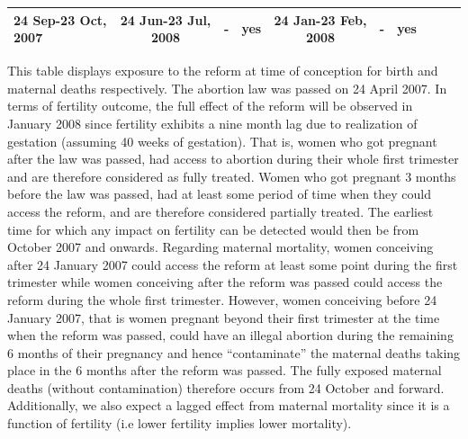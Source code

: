 \documentclass[a4paper, 11pt]{article}
\begin{document}
\begin{spacing}{1.4}
\begin{table}
\begin{threeparttable}
{\begin{tabular}{lccccccccc}
        24 Sep-23 Oct, 2007	&	24 Jun-23 Jul, 2008	&	-	&	yes	&	24 Jan-23 Feb, 2008	&	-	&	yes	\\
        \hline 	\hline 
    \end{tabular} }
    \begin{tablenotes}
      \small This table displays exposure to the reform at time of conception for birth and maternal deaths respectively. The abortion law was passed on 24 April 2007. In terms of fertility outcome, the full effect of the reform will be observed in January 2008 since fertility exhibits a nine month lag due to realization of gestation (assuming 40 weeks of gestation). That is, women who got pregnant after the law was passed, had access to abortion during their whole first trimester and are therefore considered as fully treated. Women who got pregnant 3 months before the law was passed, had at least some period of time when they could access the reform, and are therefore considered partially treated. The earliest time for which any impact on fertility can be detected would then be from October 2007 and onwards. Regarding maternal mortality, women conceiving after 24 January 2007 could access the reform at least some point during the first trimester while women conceiving after the reform was passed could access the reform during the whole first trimester. However, women conceiving before 24 January 2007, that is women pregnant beyond their first trimester at the time when the reform was passed, could have an illegal abortion during the remaining 6 months of their pregnancy and hence ``contaminate'' the maternal deaths taking place in the 6 months after the reform was passed. The fully exposed maternal deaths (without contamination) therefore occurs from 24 October and forward. Additionally, we also expect a lagged effect from maternal mortality since it is a function of fertility (i.e lower fertility implies lower mortality).  
    \end{tablenotes}
  \end{threeparttable} 	
\end{table}  


\end{spacing}
\end{document}
